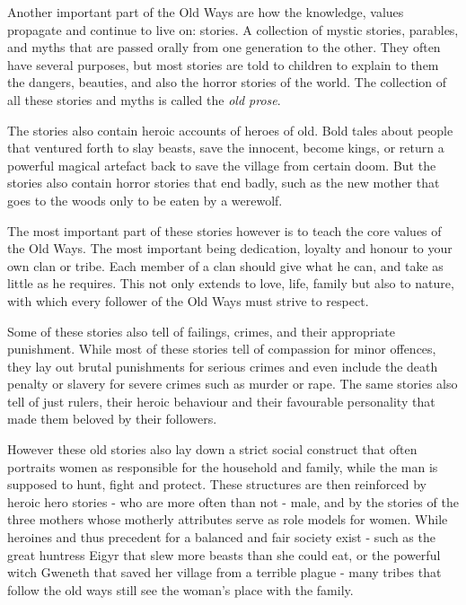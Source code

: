 
Another important part of the Old Ways are how the knowledge, values propagate
and continue to live on: stories. A collection of mystic stories, parables,
and myths that are passed orally from one generation to the other. They often
have several purposes, but most stories are told to children to explain to
them the dangers, beauties, and also the horror stories of the world. The
collection of all these stories and myths is called the \emph{old prose}.

The stories also contain heroic accounts of heroes of old. Bold tales about
people that ventured forth to slay beasts, save the innocent, become kings, or
return a powerful magical artefact back to save the village from certain doom.
But the stories also contain horror stories that end badly, such as the new
mother that goes to the woods only to be eaten by a werewolf.

The most important part of these stories however is to teach the core values of
the Old Ways. The most important being dedication, loyalty and honour to your
own clan or tribe. Each member of a clan should give what he can, and take as
little as he requires. This not only extends to love, life, family but also
to nature, with which every follower of the Old Ways must strive to respect.

Some of these stories also tell of failings, crimes, and their appropriate
punishment. While most of these stories tell of compassion for minor offences,
they lay out brutal punishments for serious crimes and even include the death
penalty or slavery for severe crimes such as murder or rape. The same stories
also tell of just rulers, their heroic behaviour and their favourable
personality that made them beloved by their followers.

However these old stories also lay down a strict social construct that often
portraits women as responsible for the household and family, while the man is
supposed to hunt, fight and protect. These structures are then reinforced by
heroic hero stories - who are more often than not - male, and by the stories
of the three mothers whose motherly attributes serve as role models for women.
While heroines and thus precedent for a balanced and fair society exist - such
as the great huntress Eigyr that slew more beasts than she could eat, or the
powerful witch Gweneth that saved her village from a terrible plague - many
tribes that follow the old ways still see the woman's place with the family.


